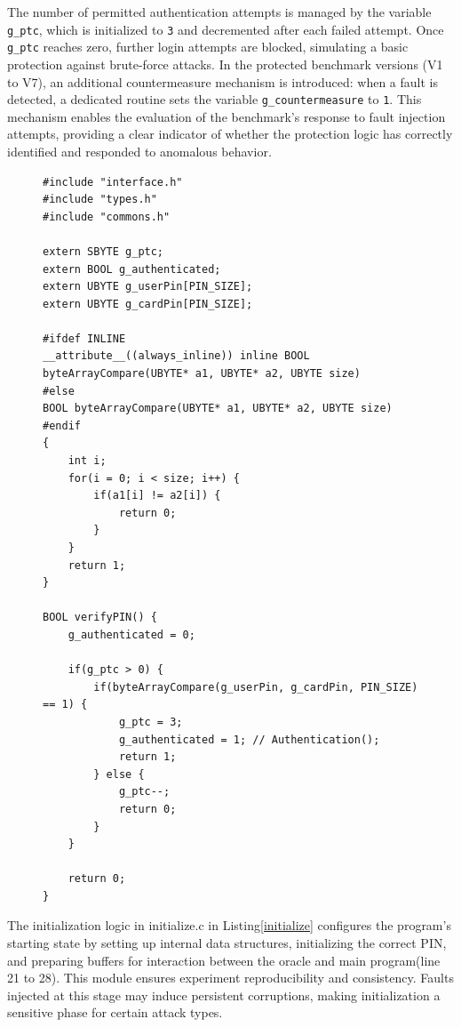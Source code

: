 The number of permitted authentication attempts is managed by the variable \texttt{g\_ptc}, which is initialized to \texttt{3} and decremented after each failed attempt. Once \texttt{g\_ptc} reaches zero, further login attempts are blocked, simulating a basic protection against brute-force attacks. In the protected benchmark versions (V1 to V7), an additional countermeasure mechanism is introduced: when a fault is detected, a dedicated routine sets the variable \texttt{g\_countermeasure} to \texttt{1}. This mechanism enables the evaluation of the benchmark’s response to fault injection attempts, providing a clear indicator of whether the protection logic has correctly identified and responded to anomalous behavior.
\begin{figure}
\begin{lstlisting}[caption={code.c of VerifyPin function in benchmark V0}, label={code}, basicstyle=\ttfamily\footnotesize]
#include "interface.h"
#include "types.h"
#include "commons.h"

extern SBYTE g_ptc;
extern BOOL g_authenticated;
extern UBYTE g_userPin[PIN_SIZE];
extern UBYTE g_cardPin[PIN_SIZE];

#ifdef INLINE
__attribute__((always_inline)) inline BOOL byteArrayCompare(UBYTE* a1, UBYTE* a2, UBYTE size)
#else
BOOL byteArrayCompare(UBYTE* a1, UBYTE* a2, UBYTE size)
#endif
{
    int i;
    for(i = 0; i < size; i++) {
        if(a1[i] != a2[i]) {
            return 0;
        }
    }
    return 1;
}

BOOL verifyPIN() {
    g_authenticated = 0;

    if(g_ptc > 0) {
        if(byteArrayCompare(g_userPin, g_cardPin, PIN_SIZE) == 1) {
            g_ptc = 3;
            g_authenticated = 1; // Authentication();
            return 1;
        } else {
            g_ptc--;
            return 0;
        }
    }

    return 0;
}
\end{lstlisting}
\end{figure}
The initialization logic in initialize.c in Listing\ref{initialize} configures the program’s starting state by setting up internal data structures, initializing the correct PIN, and preparing buffers for interaction between the oracle and main program(line 21 to 28). This module ensures experiment reproducibility and consistency. Faults injected at this stage may induce persistent corruptions, making initialization a sensitive phase for certain attack types.
